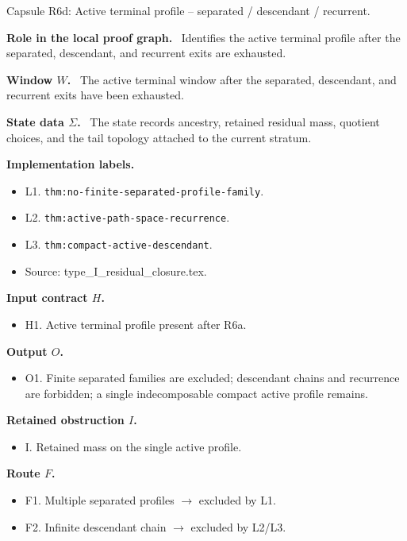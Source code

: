 \documentclass[11pt]{amsart}
\newcommand{\capsulefield}[1]{\par\smallskip\noindent\textbf{#1.}\ }
\begin{document}
\begin{proofcapsule}{Capsule R6d: Active terminal profile -- separated / descendant / recurrent.}
  \capsulefield{Role in the local proof graph}
  Identifies the active terminal profile after the separated, descendant, and recurrent exits are exhausted.

  \capsulefield{Window \(W\)}
The active terminal window after the separated, descendant, and recurrent exits have been exhausted.

  \capsulefield{State data \(\Sigma\)}
The state records ancestry, retained residual mass, quotient choices, and the tail topology attached to the current stratum.

  \capsulefield{Implementation labels}
  \begin{itemize}[leftmargin=1.8em]
  \item L1. \texttt{thm:no-finite-separated-profile-family}.
  \item L2. \texttt{thm:active-path-space-recurrence}.
  \item L3. \texttt{thm:compact-active-descendant}.
  \item Source: type\_I\_residual\_closure.tex.
  \end{itemize}

  \capsulefield{Input contract \(H\)}
  \begin{itemize}[leftmargin=1.8em]
  \item H1. Active terminal profile present after R6a.
  \end{itemize}

  \capsulefield{Output \(O\)}
  \begin{itemize}[leftmargin=1.8em]
  \item O1. Finite separated families are excluded; descendant chains and recurrence are forbidden; a single indecomposable compact active profile remains.
  \end{itemize}

  \capsulefield{Retained obstruction \(I\)}
  \begin{itemize}[leftmargin=1.8em]
  \item I. Retained mass on the single active profile.
  \end{itemize}

  \capsulefield{Route \(F\)}
  \begin{itemize}[leftmargin=1.8em]
  \item F1. Multiple separated profiles $\to$ excluded by L1.
  \item F2. Infinite descendant chain $\to$ excluded by L2/L3.
  \end{itemize}


\end{proofcapsule}
\end{document}
